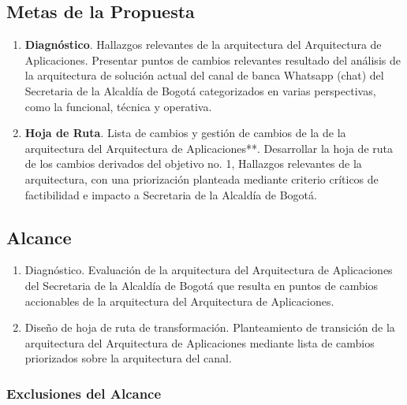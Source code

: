 \documentclass[
	a4paper, %
	12pt, %
]{include/CSSullivanBusinessReport}
\def\tightlist{}
\begin{document}
\subsection{Metas de la Propuesta}\label{sec:metas-de-la-propuesta}

\begin{quote}
\end{quote}

\begin{enumerate}
\def\labelenumi{\arabic{enumi}.}
\tightlist
\item
  \textbf{Diagnóstico}. Hallazgos relevantes de la arquitectura del
  Arquitectura de Aplicaciones. Presentar puntos de cambios relevantes
  resultado del análisis de la arquitectura de solución actual del canal
  de banca Whatsapp (chat) del Secretaria de la Alcaldía de Bogotá
  categorizados en varias perspectivas, como la funcional, técnica y
  operativa.
\item
  \textbf{Hoja de Ruta}. Lista de cambios y gestión de cambios de la de
  la arquitectura del Arquitectura de Aplicaciones**. Desarrollar la
  hoja de ruta de los cambios derivados del objetivo no. 1, Hallazgos
  relevantes de la arquitectura, con una priorización planteada mediante
  criterio críticos de factibilidad e impacto a Secretaria de la
  Alcaldía de Bogotá.
\end{enumerate}

\subsection{Alcance}\label{sec:alcance}

\begin{quote}
\end{quote}

\begin{enumerate}
\def\labelenumi{\arabic{enumi}.}
\tightlist
\item
  Diagnóstico. Evaluación de la arquitectura del Arquitectura de
  Aplicaciones del Secretaria de la Alcaldía de Bogotá que resulta en
  puntos de cambios accionables de la arquitectura del Arquitectura de
  Aplicaciones.
\item
  Diseño de hoja de ruta de transformación. Planteamiento de transición
  de la arquitectura del Arquitectura de Aplicaciones mediante lista de
  cambios priorizados sobre la arquitectura del canal.
\end{enumerate}

\subsubsection{Exclusiones del
Alcance}\label{sec:exclusiones-del-alcance}
\end{document}
